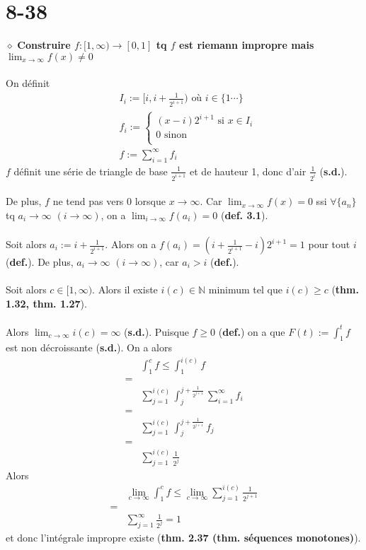\documentclass[a4paper,10pt]{article}
\begin{document}
\section*{8-38}
$\diamond$ \textbf{Construire $f:[1,\infty) \rightarrow [0,1]$ tq $f$ est riemann impropre mais $\lim_{x \to \infty} f(x) \not = 0$}
\\
\\
On définit
\begin{align*}
 & I_i := [i, i+\frac{1}{2^{i+1}}) \text{ où $i \in \{1 \cdots \}$}\\
 & f_i := \left\{
    \begin{array}{l}
      (x - i)2^{i+1} \mbox{ si } x \in I_i \\
      0 \mbox{ sinon } \\ 
    \end{array}
    \right. \\
 & f := \sum_{i=1}^{\infty} f_i
\end{align*} 
$f$ définit une série de triangle de base $\frac{1}{2^{i+1}}$ et de hauteur 1, donc d'air $\frac{1}{2^i}$ (\textbf{s.d.}).
\\
\\
De plus, $f$ ne tend pas vers $0$ lorsque $x \rightarrow \infty$. Car $\lim_{x \to \infty} f(x) = 0$ ssi $\forall \{a_n\}$ tq
$a_i \rightarrow \infty$ $(i \rightarrow \infty)$, on a $\lim_{i \to \infty} f(a_i) = 0$ (\textbf{def. 3.1}).
\\
\\
Soit alors $a_i := i + \frac{1}{2^{i+1}}$. Alors on a $f(a_i) = (i + \frac{1}{2^{i+1}} - i)2^{i+1} = 1$ pour tout $i$ (\textbf{def.}). 
De plus, $a_i \rightarrow \infty$ $(i \rightarrow \infty)$, car $a_i > i$ (\textbf{def.}).
\\
\\
Soit alors $c \in [1, \infty)$. Alors il existe $i(c) \in \mathbb{N}$ minimum tel que $i(c) \geq c$ (\textbf{thm. 1.32, thm. 1.27}).
\\
\\
Alors $\lim_{c \to \infty} i(c) = \infty$ (\textbf{s.d.}). Puisque $f \geq 0$ (\textbf{def.}) on a que $F(t) := \int_1^t f$ est non
décroissante (\textbf{s.d.}). On a alors
\begin{align*}
  & \int_1^c f \leq \int_1^{i(c)} f \\
  = \\
  & \sum_{j=1}^{i(c)} \int_j^{j+\frac{1}{2^{j+1}}} \sum_{i=1}^\infty f_i \\
  = \\
  & \sum_{j=1}^{i(c)} \int_j^{j+\frac{1}{2^{j+1}}} f_j \\
  = \\
  & \sum_{j=1}^{i(c)} \frac{1}{2^j}
\end{align*}
Alors 
\begin{align*}
 & \lim_{c \to \infty} \int_1^c f \leq \lim_{c \to \infty}\sum_{j=1}^{i(c)} \frac{1}{2^{j+1}} \\
 = \\
 & \sum_{j=1}^{\infty} \frac{1}{2^j} = 1
\end{align*}
et donc l'intégrale impropre existe (\textbf{thm. 2.37 (thm. séquences monotones)}).
\end{document}
